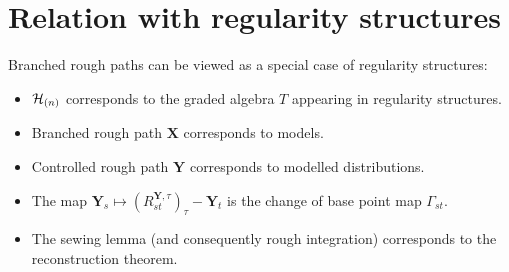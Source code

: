 \documentclass[a4paper, 10pt]{style/preprint}
\begin{document}
\section{Relation with regularity structures}

Branched rough paths can be viewed as a special case of regularity structures:
\begin{itemize}
  \item \({\mathcal H}_{(n)}\) corresponds to the graded algebra \(T\) appearing in regularity structures.
  \item Branched rough path \(\mathbf{X}\) corresponds to models.
  \item Controlled rough path \(\mathbf{Y}\) corresponds to modelled distributions.
  \item The map \(\mathbf{Y}_s \mapsto (R^{\mathbf{Y}, \tau}_{st})_\tau - \mathbf{Y}_t\) is the 
    change of base point map \(\Gamma_{st}\).
  \item The sewing lemma (and consequently rough integration) corresponds to the reconstruction theorem.
\end{itemize}
\end{document}
